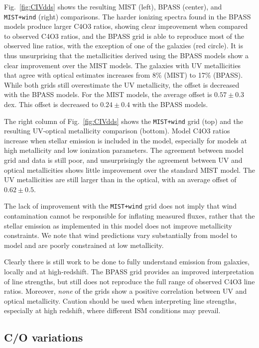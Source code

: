 \documentclass[preprint2]{aastex62}
\newcommand{\civ}{\ion{C}{4}}
\begin{document}
Fig.~\ref{fig:CIVdds} shows the resulting MIST (left), BPASS (center), and {\tt MIST+wind} (right) comparisons. The harder ionizing spectra found in the BPASS models produce larger C4O3 ratios, showing clear improvement when compared to observed C4O3 ratios, and the BPASS grid is able to reproduce most of the observed line ratios, with the exception of one of the \citet{Senchyna+2017} galaxies (red circle). It is thus unsurprising that the metallicities derived using the BPASS models show a clear improvement over the MIST models. The galaxies with UV metallicities that agree with optical estimates increases from 8\% (MIST) to 17\% (BPASS). While both grids still overestimate the UV metallicity, the offset is decreased with the BPASS models. For the MIST models, the average offset is $0.57 \pm 0.3$ dex. This offset is decreased to $0.24 \pm 0.4$ with the BPASS models.

The right column of Fig.~\ref{fig:CIVdds} shows the {\tt MIST+wind} grid (top) and the resulting UV-optical metallicity comparison (bottom). Model C4O3 ratios increase when stellar emission is included in the model, especially for models at high metallicity and low ionization parameters. The agreement between model grid and data is still poor, and unsurprisingly the agreement between UV and optical metallicities shows little improvement over the standard MIST model. The UV metallicities are still larger than in the optical, with an average offset of $0.62 \pm 0.5$.

The lack of improvement with the {\tt MIST+wind} grid does not imply that wind contamination cannot be responsible for inflating measured \civ{} fluxes, rather that the stellar emission as implemented in this model does not improve metallicity constraints. We note that wind predictions vary substantially from model to model and are poorly constrained at low metallicity.

Clearly there is still work to be done to fully understand \civ{} emission from galaxies, locally and at high-redshift. The BPASS grid provides an improved interpretation of \civ{} line strengths, but still does not reproduce the full range of observed C4O3 line ratios. Moreover, \emph{none} of the \civ{} grids show a positive correlation between UV and optical metallicity. Caution should be used when interpreting \civ{} line strengths, especially at high redshift, where different ISM conditions may prevail.

\subsection{C/O variations} \label{sec:discussion:CIII}
\end{document}
